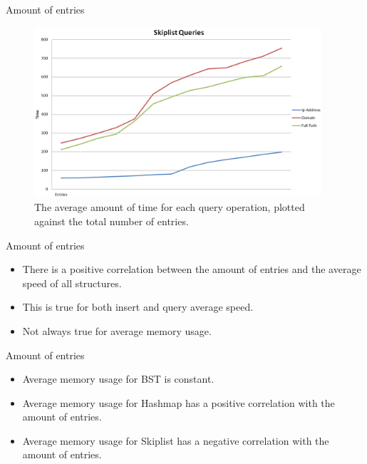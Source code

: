 \documentclass[10pt]{beamer}
\begin{document}
\begin{frame}{Amount of entries}
    \begin{figure}
      \centering
        \includegraphics[width=0.95\textwidth]{SkiplistQuery}
      \caption{The average amount of time for each query operation, plotted against the total number of entries.}
    \end{figure}
\end{frame}

\begin{frame}{Amount of entries}
    \begin{itemize}
        \item There is a positive correlation between the amount of entries and the average speed of all structures.
        \item This is true for both insert and query average speed.
        \item Not always true for average memory usage.
    \end{itemize}
\end{frame}

\begin{frame}{Amount of entries}
    \begin{itemize}
        \item Average memory usage for BST is constant.
        \item Average memory usage for Hashmap has a positive correlation with the amount of entries.
        \item Average memory usage for Skiplist has a negative correlation with the amount of entries.
    \end{itemize}
\end{frame}
\end{document}
